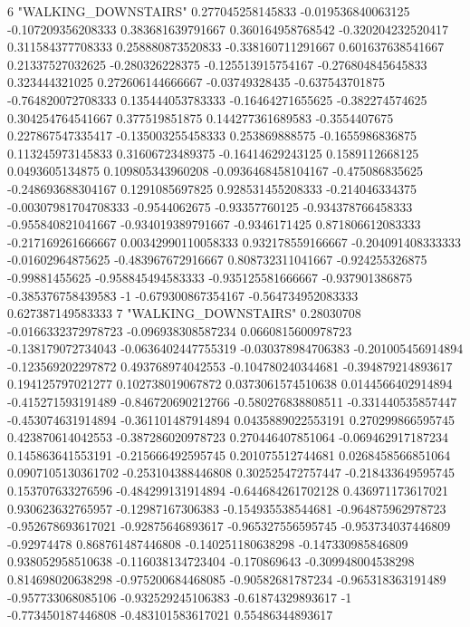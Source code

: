 6 "WALKING_DOWNSTAIRS" 0.277045258145833 -0.019536840063125 -0.107209356208333 0.383681639791667 0.360164958768542 -0.320204232520417 0.311584377708333 0.258880873520833 -0.338160711291667 0.601637638541667 0.21337527032625 -0.280326228375 -0.125513915754167 -0.276804845645833 0.323444321025 0.272606144666667 -0.03749328435 -0.637543701875 -0.764820072708333 0.135444053783333 -0.16464271655625 -0.382274574625 0.304254764541667 0.377519851875 0.144277361689583 -0.3554407675 0.227867547335417 -0.135003255458333 0.253869888575 -0.1655986836875 0.113245973145833 0.31606723489375 -0.16414629243125 0.1589112668125 0.0493605134875 0.109805343960208 -0.0936468458104167 -0.475086835625 -0.248693688304167 0.1291085697825 0.928531455208333 -0.214046334375 -0.00307981704708333 -0.9544062675 -0.93357760125 -0.934378766458333 -0.955840821041667 -0.934019389791667 -0.9346171425 0.871806612083333 -0.217169261666667 0.00342990110058333 0.932178559166667 -0.204091408333333 -0.01602964875625 -0.483967672916667 0.808732311041667 -0.924255326875 -0.99881455625 -0.958845494583333 -0.935125581666667 -0.937901386875 -0.385376758439583 -1 -0.679300867354167 -0.564734952083333 0.627387149583333
7 "WALKING_DOWNSTAIRS" 0.28030708 -0.0166332372978723 -0.096938308587234 0.0660815600978723 -0.138179072734043 -0.0636402447755319 -0.030378984706383 -0.201005456914894 -0.123569202297872 0.493768974042553 -0.104780240344681 -0.394879214893617 0.194125797021277 0.102738019067872 0.0373061574510638 0.0144566402914894 -0.415271593191489 -0.846720690212766 -0.580276838808511 -0.331440535857447 -0.453074631914894 -0.361101487914894 0.0435889022553191 0.270299866595745 0.423870614042553 -0.387286020978723 0.270446407851064 -0.069462917187234 0.145863641553191 -0.215666492595745 0.201075512744681 0.0268458566851064 0.0907105130361702 -0.253104388446808 0.302525472757447 -0.218433649595745 0.153707633276596 -0.484299131914894 -0.644684261702128 0.436971173617021 0.930623632765957 -0.12987167306383 -0.154935538544681 -0.964875962978723 -0.952678693617021 -0.92875646893617 -0.965327556595745 -0.953734037446809 -0.92974478 0.868761487446808 -0.140251180638298 -0.147330985846809 0.938052958510638 -0.116038134723404 -0.170869643 -0.309948004538298 0.814698020638298 -0.975200684468085 -0.90582681787234 -0.965318363191489 -0.957733068085106 -0.932529245106383 -0.61874329893617 -1 -0.773450187446808 -0.483101583617021 0.55486344893617
